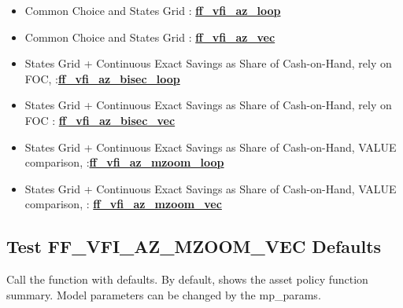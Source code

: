 \documentclass[
]{book}
\begin{document}
\begin{itemize}
\item
  Common Choice and States Grid :
  \href{https://github.com/FanWangEcon/MEconTools/blob/master/MEconTools/vfi/ff_vfi_az_loop.m}{\textbf{ff\_vfi\_az\_loop}}
\item
  Common Choice and States Grid :
  \href{https://github.com/FanWangEcon/MEconTools/blob/master/MEconTools/vfi/ff_vfi_az_vec.m}{\textbf{ff\_vfi\_az\_vec}}
\item
  States Grid + Continuous Exact Savings as Share of Cash-on-Hand,
  rely on FOC, :\href{https://github.com/FanWangEcon/MEconTools/blob/master/MEconTools/vfi/ff_vfi_az_bisec_loop.m}{\textbf{ff\_vfi\_az\_bisec\_loop}}
\item
  States Grid + Continuous Exact Savings as Share of Cash-on-Hand,
  rely on FOC :
  \href{https://github.com/FanWangEcon/MEconTools/blob/master/MEconTools/vfi/ff_vfi_az_bisec_vec.m}{\textbf{ff\_vfi\_az\_bisec\_vec}}
\item
  States Grid + Continuous Exact Savings as Share of Cash-on-Hand,
  VALUE comparison, :\href{https://github.com/FanWangEcon/MEconTools/blob/master/MEconTools/vfi/ff_vfi_az_mzoom_loop.m}{\textbf{ff\_vfi\_az\_mzoom\_loop}}
\item
  States Grid + Continuous Exact Savings as Share of Cash-on-Hand,
  VALUE comparison, :
  \href{https://github.com/FanWangEcon/MEconTools/blob/master/MEconTools/vfi/ff_vfi_az_mzoom_vec.m}{\textbf{ff\_vfi\_az\_mzoom\_vec}}
\end{itemize}

\hypertarget{test-ff_vfi_az_mzoom_vec-defaults}{%
\subsection{Test FF\_VFI\_AZ\_MZOOM\_VEC Defaults}\label{test-ff_vfi_az_mzoom_vec-defaults}}

Call the function with defaults. By default, shows the asset policy
function summary. Model parameters can be changed by the mp\_params.
\end{document}
